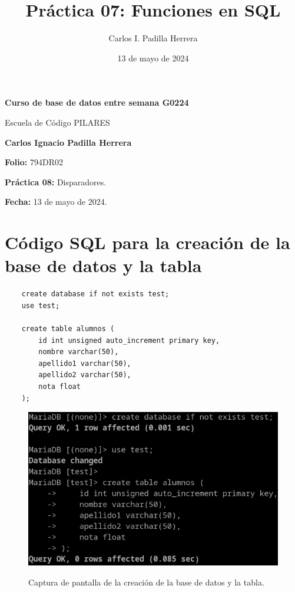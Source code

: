 \documentclass{article}
\title{Práctica 07: Funciones en SQL}
\author{Carlos I. Padilla Herrera}
\date{13 de mayo de 2024}
\begin{document}
\begin{titlepage}
    \centering
    \vspace*{1cm}
    \Huge\textbf{Curso de base de datos entre semana G0224}
    
    \vspace{0.5cm}
    \LARGE Escuela de Código PILARES
    
    \vspace{1.5cm}
    \textbf{Carlos Ignacio Padilla Herrera}
    
    \vspace{2cm}
    \Large\textbf{Folio:} 794DR02
    
    \vspace{0.5cm}
    \Large\textbf{Práctica 08:} Disparadores.
    
    \vfill
    
    \Large\textbf{Fecha:} 13 de mayo de 2024.
    
    \vspace{0.8cm}
\end{titlepage}

\newpage

\section*{Código SQL para la creación de la base de datos y la tabla}

\begin{lstlisting}
    create database if not exists test;
    use test;
    
    create table alumnos (
        id int unsigned auto_increment primary key,
        nombre varchar(50),
        apellido1 varchar(50),
        apellido2 varchar(50),
        nota float
    );    
\end{lstlisting}
\begin{figure}[ht]
    \centering
    {
        \includegraphics[width=\linewidth]{01screenshot.png} %
    }
    \caption{Captura de pantalla de la creación de la base de datos y la tabla.}
\end{figure}
\newpage %
\end{document}
